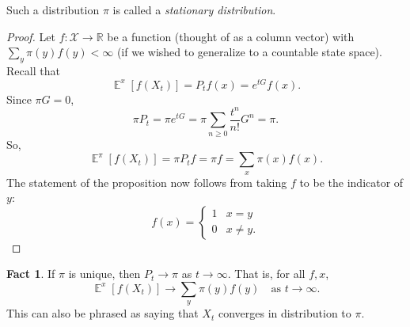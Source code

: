 \documentclass[../../../Master/AppliedStochastics.tex]{subfiles}
\theoremstyle{definition}
\newtheorem{fact}{Fact}
\DeclareMathOperator{\e}{\mathbb{E}}
\newcommand{\R}{\mathbb{R}}
\begin{document}
Such a distribution $\pi$ is called a \emph{stationary distribution}.


\begin{proof}
Let $f:\mathcal{X}\to \R$ be a function (thought of as a column vector) with $\sum_y \pi(y)f(y) < \infty$ (if we wished to generalize to a countable state space). Recall that
\[
	\e^x[f(X_t)] = P_t f(x) = e^{tG}f(x).
\]
Since $\pi G = 0$, 
\[
	\pi P_t = \pi e^{tG} = \pi \sum_{n\geq 0} \frac{t^n}{n!} G^n = \pi.
\]
So,
\[
	\e^\pi[f(X_t)] = \pi P_t f = \pi f = \sum_{x} \pi(x) f(x).
\]
The statement of the proposition now follows from taking $f$ to be the indicator of $y$:
\[
	f(x) = \begin{cases}
		1 & x=y\\
		0 & x\neq y.
	\end{cases}
\]
\end{proof}

\begin{fact}
	If $\pi$ is unique, then $P_t \to \pi$ as $t\to \infty$. That is, for all $f, x$, 
	\[
		\e^x[f(X_t)]\to \sum_y \pi(y) f(y) \quad \text{as }t\to \infty.
	\]
	This can also be phrased as saying that $X_t$ converges in distribution to $\pi$. 
\end{fact}
\end{document}
